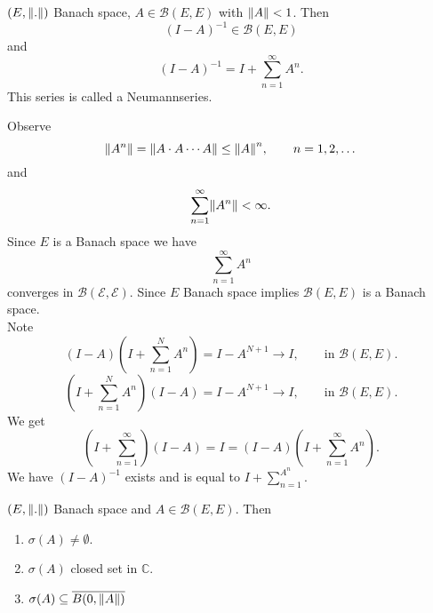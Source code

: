 \begin{lemma*}
 	$(E,\norm{.})$ Banach space, $A \in \mathcal{B}(E,E)$ with $\norm{A} < 1$. Then
	\[
		(I-A)^{-1} \in \mathcal{B}(E,E)
	\]
	and
	\[
		(I-A)^{-1} = I + \sum_{n=1}^{\infty} A^n.
	\]
	This series is called a Neumannseries. 
 \end{lemma*}
\begin{beweis}
	Observe
	\[
		\norm{A^n} = \norm{A \cdot A \cdots A} \leq \norm{A}^n, \qquad n = 1,2,\dots
	\]
	and
	\[
		\sum_{n=1}^{\infty}\norm{A^n}< \infty.
	\]
	Since $E$ is a Banach space we have
	\[
		\sum_{n=1}^{\infty}A^n 
	\]
	converges in $\mathcal{B(E,E)}$. Since $E$ Banach space implies $\mathcal{B}(E,E)$ is a Banach space. \\
	Note
	\[
		(I-A)\left( I+ \sum_{n=1}^{N} A^n \right) = I-A^{N+1} \to I, \qquad \text{in }\mathcal{B}(E,E).
	\]
	\[
		\left(I + \sum_{n=1}^{N}A^n \right)(I-A) = I-A^{N+1} \to I, \qquad \text{in }\mathcal{B}(E,E).
	\]
	We get
	\[
		\left( I + \sum_{n=1}^{\infty} \right)(I-A) = I = (I-A)(I + \sum_{n=1}^{\infty}A^n).
	\]
	We have $(I-A)^{-1} $ exists and is equal to $I+ \sum_{n=1}^{A^n}$.
\end{beweis}
 \begin{lemma*}
 	$(E,\norm{.})$ Banach space and $A \in \mathcal{B}(E,E)$. Then
	\begin{enumerate}
		\item $\sigma(A) \neq \emptyset$.
		\item $\sigma(A)$ closed set in $\mathbb{C}$.
		\item $\sigma(A) \subseteq \overline{B(0,\norm{A})}$
	\end{enumerate}
 \end{lemma*}
